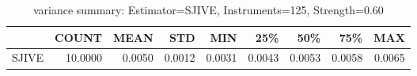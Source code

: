\begin{table}[ht]
\centering
\caption{variance summary: Estimator=SJIVE, Instruments=125, Strength=0.60}
\begin{tabular}{lrrrrrrrr}
\toprule
 & COUNT & MEAN & STD & MIN & 25\% & 50\% & 75\% & MAX \\
\midrule
SJIVE & 10.0000 & 0.0050 & 0.0012 & 0.0031 & 0.0043 & 0.0053 & 0.0058 & 0.0065 \\
\bottomrule
\end{tabular}
\end{table}
